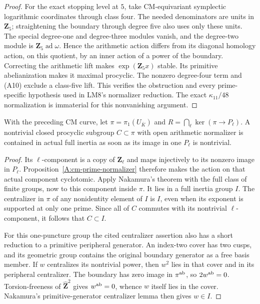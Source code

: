 \begin{proof}
For the exact stopping level at $5$, take
CM-equivariant symplectic logarithmic coordinates
through class four.  The needed denominators
are units in $\mathbf Z_5$; straightening the
boundary through degree five also uses only
these units.  The special degree-one and
degree-three modules vanish, and the
degree-two module is
$\mathbf Z_5\operatorname{ad}\omega$.
Hence the arithmetic action differs from
its diagonal homology action, on this
quotient, by an inner action of a power
of the boundary.  Correcting the arithmetic
lift makes $\exp(\mathbf Z_5x)$ stable.
Its primitive abelianization makes it
maximal procyclic.  The nonzero degree-four
term and (A10) exclude a class-five lift.
This verifies the obstruction and every
prime-specific hypothesis used in LM8's
normalizer reduction.  The exact
$\kappa_{11}/48$ normalization is immaterial
for this nonvanishing argument.
\end{proof}

\begin{proposition}
\label{A:cm-detected-normalizer}
With the preceding CM curve, let
$\pi=\pi_1(U_{\overline K})$ and
$R=\bigcap_\ell\ker(\pi\to P_\ell)$.
A nontrivial closed procyclic subgroup
$C\subset\pi$ with open arithmetic
normalizer is contained in actual full
inertia as soon as its image in one
$P_\ell$ is nontrivial.
\end{proposition}
\begin{proof}
Its $\ell$-component is a copy of
$\mathbf Z_\ell$ and maps injectively to
its nonzero image in $P_\ell$.
Proposition~\ref{A:cm-prime-normalizer}
therefore makes the action on that actual
component cyclotomic.  Apply Nakamura's
theorem with the full class of finite
groups, now to this component inside
$\pi$.  It lies in a full inertia group
$I$.  The centralizer in $\pi$ of any
nonidentity element of $I$ is $I$, even
when its exponent is supported at only
one prime.  Since all of $C$ commutes
with its nontrivial $\ell$-component,
it follows that $C\subset I$.

For this one-puncture group the cited
centralizer assertion also has a short
reduction to a primitive peripheral
generator.  An index-two cover has two
cusps, and its geometric group contains
the original boundary generator as a
free basis member.  If $w$ centralizes
its nontrivial power, then $w^2$ lies
in that cover and in its peripheral
centralizer.  The boundary has zero
image in $\pi^{\rm ab}$, so
$2w^{\rm ab}=0$.  Torsion-freeness of
$\widehat{\mathbf Z}^2$ gives
$w^{\rm ab}=0$, whence $w$ itself
lies in the cover.  Nakamura's
primitive-generator centralizer lemma
then gives $w\in I$.
\end{proof}

